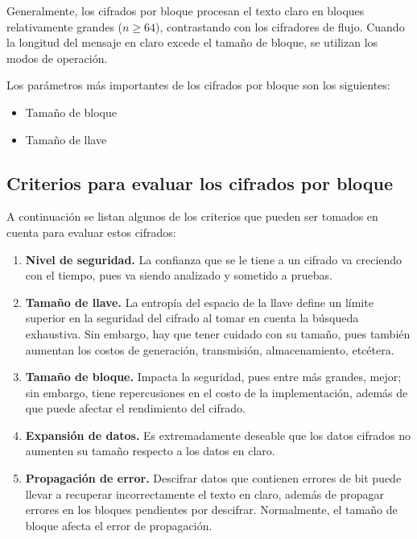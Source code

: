 Generalmente, los cifrados por bloque procesan el texto claro en bloques 
relativamente grandes ($n \geq 64$), contrastando con los cifradores de 
flujo. Cuando la longitud del mensaje en claro excede el tamaño de 
bloque, se utilizan los modos de operación.

Los parámetros más importantes de los cifrados por bloque son los 
siguientes:
\begin{itemize}
	\item Tamaño de bloque
	\item Tamaño de llave
\end{itemize}

\subsection{Criterios para evaluar los cifrados por bloque}

A continuación se listan algunos de los criterios que pueden ser tomados en cuenta para evaluar estos cifrados:
\begin{enumerate}
	\item \textbf{Nivel de seguridad.} La confianza que se le tiene a un 
		cifrado va creciendo con el tiempo, pues va siendo analizado y 
		sometido a pruebas.
	\item \textbf{Tamaño de llave.} La entropía del espacio de la llave 
		define un límite superior en la seguridad del cifrado al tomar en 
		cuenta la búsqueda exhaustiva. Sin embargo, hay que tener cuidado 
		con su tamaño, pues también aumentan los costos de generación, 
		transmisión, almacenamiento, etcétera.
	\item \textbf{Tamaño de bloque.} Impacta la seguridad, pues entre más 
		grandes, mejor; sin embargo, tiene repercusiones en el costo de la 
		implementación, además de que puede afectar el rendimiento del 
		cifrado.
	\item \textbf{Expansión de datos.} Es extremadamente deseable que los 
		datos cifrados no aumenten su tamaño respecto a los datos en claro.
	\item \textbf{Propagación de error.} Descifrar datos que contienen 
		errores de bit puede llevar a recuperar incorrectamente el texto en
		claro, además de propagar errores en los bloques pendientes por 
		descifrar. Normalmente, el tamaño de bloque afecta el error de 
		propagación.
\end{enumerate}







